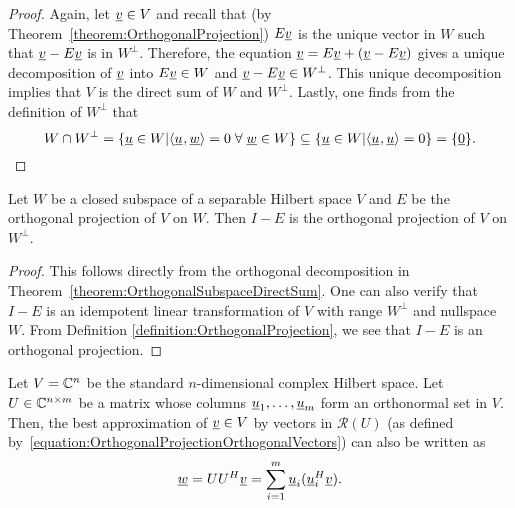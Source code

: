 \begin{proof}
Again, let $\underline{v} \in V$ and recall that (by Theorem~\ref{theorem:OrthogonalProjection}) $E \underline{v}$ is the unique vector in $W$ such that $\underline{v} - E \underline{v}$ is in $W^{\bot}$.
Therefore, the equation $\underline{v} = E \underline{v} + \left( \underline{v} - E \underline{v} \right)$ gives a unique decomposition of $\underline{v}$ into $E \underline{v} \in W$ and $\underline{v} - E \underline{v} \in W^{\bot}$.
This unique decomposition implies that $V$ is the direct sum of $W$ and $W^{\bot}$.
Lastly, one finds from the definition of $W^{\bot}$ that
\[W \cap W^{\bot} = \left\{ \underline{u} \in W | {\langle  \underline{u}  \mskip1mu ,  \underline{w}  \rangle} =0 \; \forall \; \underline{w}\in W \right\}  \subseteq \left\{ \underline{u} \in W | {\langle  \underline{u}  \mskip1mu ,  \underline{u}  \rangle} =0 \right\}  = \{ \underline{0} \} . \qedhere \]
\end{proof}

\begin{corollary}
Let $W$ be a closed subspace of a separable Hilbert space $V$ and $E$ be the orthogonal projection of $V$ on $W$.
Then $I - E$ is the orthogonal projection of $V$ on $W^{\bot}$.
\end{corollary}
\begin{proof}
This follows directly from the orthogonal decomposition in Theorem~\ref{theorem:OrthogonalSubspaceDirectSum}.
One can also verify that $I-E$ is an idempotent linear transformation of $V$ with range $W^{\bot}$ and nullspace $W$.
From Definition \ref{definition:OrthogonalProjection}, we see that $I-E$ is an orthogonal projection.
\end{proof}

\begin{example}
Let $V = \mathbb{C}^n$ be the standard $n$-dimensional complex Hilbert space.
Let $U \in \mathbb{C}^{n\times m}$ be a matrix whose columns $\underline{u}_1,\ldots,\underline{u}_m$ form an orthonormal set in $V$.
Then, the best approximation of $\underline{v}\in V$ by vectors in $\mathcal{R}(U)$ (as  defined by~\eqref{equation:OrthogonalProjectionOrthogonalVectors}) can also be written as
\[ \underline{w} = U U^H \underline{v} = \sum_{i=1}^m \underline{u}_i (\underline{u}_i^H \underline{v}). \]
\end{example}



